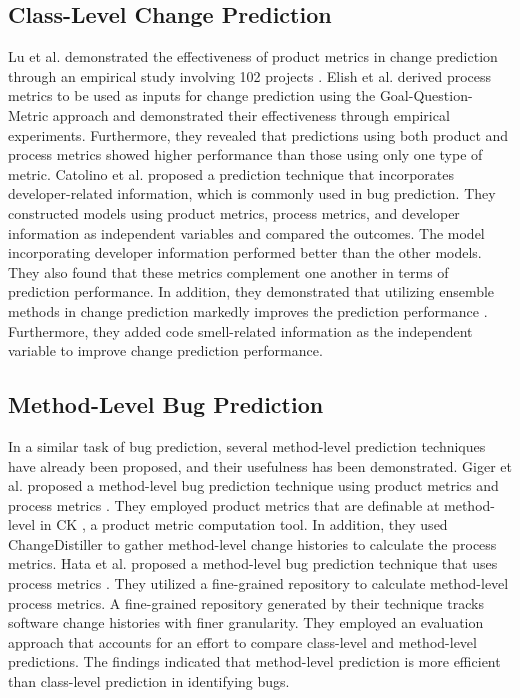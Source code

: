 \subsection{Class-Level Change Prediction}

Lu et al. demonstrated the effectiveness of product metrics in change prediction through an empirical study involving 102 projects \cite{Lu-oo}.
Elish et al. derived process metrics to be used as inputs for change prediction using the Goal-Question-Metric approach and demonstrated their effectiveness through empirical experiments\cite{elish-process}. 
Furthermore, they revealed that predictions using both product and process metrics showed higher performance than those using only one type of metric.
Catolino et al. proposed a prediction technique that incorporates developer-related information, which is commonly used in bug prediction\cite{catolino-dev}.
They constructed models using product metrics, process metrics, and developer information as independent variables and compared the outcomes.
The model incorporating developer information performed better than the other models.
They also found that these metrics complement one another in terms of prediction performance.
In addition, they demonstrated that utilizing ensemble methods in change prediction markedly improves the prediction performance \cite{catolino-ensemble}.
Furthermore, they added code smell-related information as the independent variable to improve change prediction performance\cite{catolino-smell}.

\subsection{Method-Level Bug Prediction}
In a similar task of bug prediction, several method-level prediction techniques have already been proposed, and their usefulness has been demonstrated.
Giger et al. proposed a method-level bug prediction technique using product metrics and process metrics \cite{Giger-method-bug}. 
They employed product metrics that are definable at method-level in CK \cite{aniche-ck}, a product metric computation tool. 
In addition, they used ChangeDistiller \cite{ChangeDistiller} to gather method-level change histories to calculate the process metrics.
Hata et al. proposed a method-level bug prediction technique that uses process metrics \cite{Hata-method-bug}. 
They utilized a fine-grained repository \cite{Historage} to calculate method-level process metrics.
A fine-grained repository generated by their technique \cite{Historage} tracks software change histories with finer granularity.
They employed an evaluation approach that accounts for an effort to compare class-level and method-level predictions.
The findings indicated that method-level prediction is more efficient than class-level prediction in identifying bugs. 

